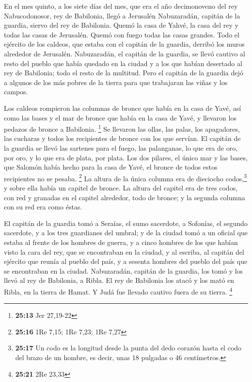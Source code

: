  En el mes quinto, a los siete días del mes, que era el
año decimonoveno del rey Nabucodonosor, rey de Babilonia, llegó a
Jerusalén Nabuzaradán, capitán de la guardia, siervo del rey de
Babilonia.  Quemó la casa de Yahvé, la casa del rey y
todas las casas de Jerusalén. Quemó con fuego todas las casas grandes.
 Todo el ejército de los caldeos, que estaba con el
capitán de la guardia, derribó los muros alrededor de Jerusalén.
 Nabuzaradán, el capitán de la guardia, se llevó cautivo
al resto del pueblo que había quedado en la ciudad y a los que habían
desertado al rey de Babilonia; todo el resto de la multitud.
 Pero el capitán de la guardia dejó a algunos de los más
pobres de la tierra para que trabajaran las viñas y los campos.

 Los caldeos rompieron las columnas de bronce que había
en la casa de Yavé, así como las bases y el mar de bronce que había en
la casa de Yavé, y llevaron los pedazos de bronce a Babilonia.
\footnote{\textbf{25:13} Jer 27,19-22}  Se llevaron las
ollas, las palas, los apagadores, las cucharas y todos los recipientes
de bronce con los que servían.  El capitán de la guardia
se llevó las sartenes para el fuego, las palanganas, lo que era de oro,
por oro, y lo que era de plata, por plata.  Los dos
pilares, el único mar y las bases, que Salomón había hecho para la casa
de Yavé, el bronce de todos estos recipientes no se pesaba. \footnote{\textbf{25:16}
  1Re 7,15; 1Re 7,23; 1Re 7,27}  La altura de la única
columna era de dieciocho codos,\footnote{\textbf{25:17} Un codo es la
  longitud desde la punta del dedo corazón hasta el codo del brazo de un
  hombre, es decir, unas 18 pulgadas o 46 centímetros.} y sobre ella
había un capitel de bronce. La altura del capitel era de tres codos, con
red y granadas en el capitel alrededor, todo de bronce; y la segunda
columna con su red era como éstas.

 El capitán de la guardia tomó a Seraías, el sumo
sacerdote, a Sofonías, el segundo sacerdote, y a los tres guardianes del
umbral;  y de la ciudad tomó a un oficial que estaba al
frente de los hombres de guerra, y a cinco hombres de los que habían
visto la cara del rey, que se encontraban en la ciudad, y al escriba, al
capitán del ejército que reunía al pueblo del país, y a sesenta hombres
del pueblo del país que se encontraban en la ciudad. 
Nabuzaradán, capitán de la guardia, los tomó y los llevó al rey de
Babilonia, a Ribla.  El rey de Babilonia los atacó y los
mató en Ribla, en la tierra de Hamat. Y Judá fue llevado cautivo fuera
de su tierra. \footnote{\textbf{25:21} 2Re 23,33}

